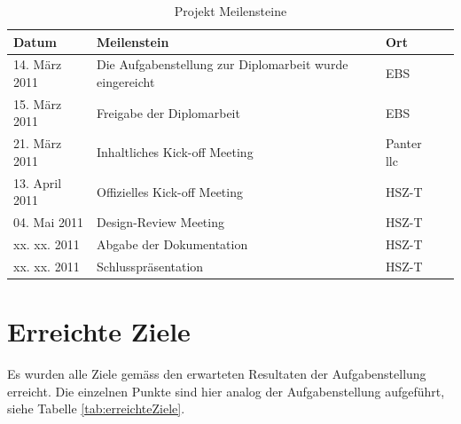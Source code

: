   \begin{table}[ht]
    \sffamily 
    \begin{center}
      \begin{tabular}{lp{7cm}ll}
        \toprule
        Datum & Meilenstein & Ort \\
        \midrule
        14. März 2011 &
        Die Aufgabenstellung zur Diplomarbeit wurde eingereicht &
        \ac{EBS}\\
        15. März 2011 &
        Freigabe der Diplomarbeit &
        \ac{EBS}\\
        21. März 2011 &
        Inhaltliches Kick-off Meeting &
        Panter llc\\
        13. April 2011 &
        Offizielles Kick-off Meeting &
        \ac{HSZ-T}\\
        04. Mai 2011 &
        Design-Review Meeting &
        \ac{HSZ-T}\\
        xx. xx. 2011 &
        Abgabe der Dokumentation &
        \ac{HSZ-T}\\
        xx. xx. 2011 &
        Schlusspräsentation &
        \ac{HSZ-T}\\
        \bottomrule
      \end{tabular}
      \caption{Projekt Meilensteine}
      \label{tab:milestones}
    \end{center}
  \end{table}
  
  \newpage
  
  \section{Erreichte Ziele}
  
  Es wurden alle Ziele gemäss den erwarteten Resultaten der Aufgabenstellung
  erreicht. Die einzelnen Punkte sind hier analog der Aufgabenstellung
  aufgeführt, siehe Tabelle \ref{tab:erreichteZiele}.
  \newline
  
